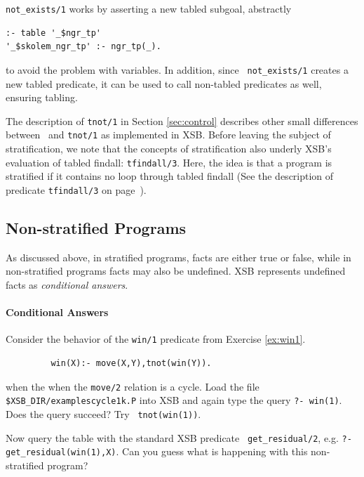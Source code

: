 {\tt not\_exists/1} works by
asserting a new tabled subgoal, abstractly 
\begin{verbatim}
:- table '_$ngr_tp'
'_$skolem_ngr_tp' :- ngr_tp(_).
\end{verbatim}
to avoid the problem with variables.  In addition, since {\tt
  not\_exists/1} creates a new tabled predicate, it can be used to call
non-tabled predicates as well, ensuring tabling.

The description of {\tt tnot/1} in Section \ref{sec:control} describes
other small differences between \not \ and {\tt tnot/1} as implemented
in XSB\@. Before leaving the subject of stratification, we note that the
concepts of stratification also underly XSB's evaluation of tabled
findall: {\tt tfindall/3}.  Here, the idea is that a program is
stratified if it contains no loop through tabled findall (See the
description of predicate {\tt tfindall/3} on
page~\pageref{tfindall/3}).

\subsection{Non-stratified Programs}
\label{sec-neg-unstratified}

As discussed above, in stratified programs, facts are either true or
false, while in non-stratified programs facts may also be undefined.
XSB represents undefined facts as {\em conditional answers}.

\paragraph*{Conditional Answers} \label{sec:conditional-answers}

\begin{exercise}
Consider the behavior of the {\tt win/1} predicate from Exercise
\ref{ex:win1}.
\begin{verbatim}
         win(X):- move(X,Y),tnot(win(Y)).
\end{verbatim}
when the when the {\tt move/2} relation is a cycle.  Load the file
{\tt \verb|$XSB_DIR/examples|cycle1k.P} into XSB and again type the
query {\tt ?- win(1)}.  Does the query succeed?  Try {\tt
tnot(win(1))}.

Now query the table with the standard XSB predicate {\tt
get\_residual/2}, e.g. {\tt ?- get\_residual(win(1),X)}.  Can you guess
what is happening with this non-stratified program?
\end{exercise}

